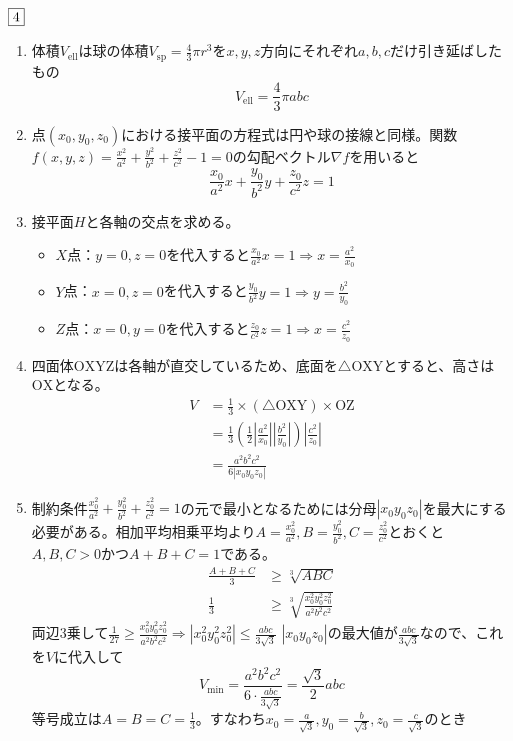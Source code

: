 \documentclass[dvipdfmx]{jsreport}
\begin{document}
\begin{souanswer} %
	$\fbox{4}$
\begin{enumerate}
	\item 体積$V_\mathrm{ell}$は球の体積$V_\mathrm{sp}= \frac{4}{3}\pi r^3$を$x, y, z$方向にそれぞれ$a, b, c$だけ引き延ばしたもの
\begin{equation*}
	V_\mathrm{ell}= \frac{4}{3}\pi abc
\end{equation*}

	\item 点$(x_0, y_0, z_0)$における接平面の方程式は円や球の接線と同様。関数$f(x, y, z)= \frac{x^2}{a^2}+ \frac{y^2}{b^2}+ \frac{z^2}{c^2}-1= 0$の勾配ベクトル$\nabla f$を用いると
\begin{equation*}
	\frac{x_0}{a^2}x+ \frac{y_0}{b^2}y+ \frac{z_0}{c^2}z= 1
\end{equation*}

	\item 接平面$H$と各軸の交点を求める。
\begin{itemize}
	\item $X$点：$y= 0, z= 0$を代入すると$\frac{x_0}{a^2}x= 1\Rightarrow x= \frac{a^2}{x_0}$
	\item $Y$点：$x= 0, z= 0$を代入すると$\frac{y_0}{b^2}y= 1\Rightarrow y= \frac{b^2}{y_0}$
	\item $Z$点：$x= 0, y= 0$を代入すると$\frac{z_0}{c^2}z= 1\Rightarrow x= \frac{c^2}{z_0}$
\end{itemize}

	\item 四面体$\mathrm{OXYZ}$は各軸が直交しているため、底面を$\triangle\mathrm{OXY}$とすると、高さは$\mathrm{OX}$となる。
\begin{align*}
	V
	&= \frac{1}{3}\times (\triangle\mathrm{OXY})\times \mathrm{OZ}\\
	&= \frac{1}{3}\left(\frac{1}{2}\left|\frac{a^2}{x_0}\right|\left|\frac{b^2}{y_0}\right|\right)\left|\frac{c^2}{z_0}\right|\\
	&= \frac{a^2b^2c^2}{6|x_0y_0z_0|}
\end{align*}

	\item 制約条件$\frac{x_0^2}{a^2}+ \frac{y_0^2}{b^2}+ \frac{z_0^2}{c^2}= 1$の元で最小となるためには分母$|x_0y_0z_0|$を最大にする必要がある。相加平均相乗平均より$A= \frac{x_0^2}{a^2}, B= \frac{y_0^2}{b^2}, C= \frac{z_0^2}{c^2}$とおくと$A, B, C> 0$かつ$A+ B+ C= 1$である。
\begin{align*}
	\frac{A+ B+ C}{3}&\ge \sqrt[3]{ABC}\\
	\frac{1}{3}&\ge \sqrt[3]{\frac{x_0^2y_0^2z_0^2}{a^2b^2c^2}}
\end{align*}
	両辺3乗して$\frac{1}{27}\ge \frac{x_0^2y_0^2z_0^2}{a^2b^2c^2}\Rightarrow |x_0^2y_0^2z_0^2|\le \frac{abc}{3\sqrt{3}}$
	$|x_0y_0z_0|$の最大値が$\frac{abc}{3\sqrt{3}}$なので、これを$V$に代入して
\begin{equation*}
	V_\mathrm{min}= \frac{a^2b^2c^2}{6\cdot \frac{abc}{3\sqrt{3}}}= \frac{\sqrt{3}}{2}abc
\end{equation*}
	等号成立は$A= B= C= \frac{1}{3}$。すなわち$x_0= \frac{a}{\sqrt{3}}, y_0= \frac{b}{\sqrt{3}}, z_0= \frac{c}{\sqrt{3}}$のとき


\end{enumerate}
\end{souanswer}
\end{document}
